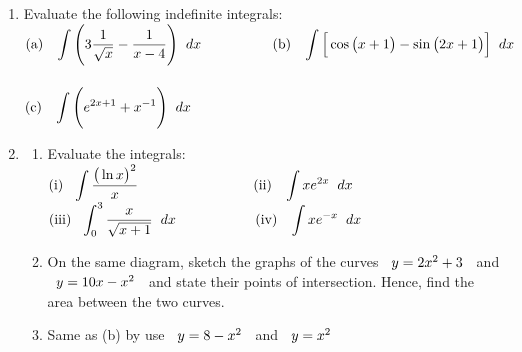 \documentclass[11pt,a4paper]{article}
\begin{document}
\begin{enumerate}
\item Evaluate the following indefinite integrals:\\

$\displaystyle{(\text{a})\hspace{0.3cm} \int \Bigg(3\frac{1}{\sqrt{x}} - \dfrac{1}{x - 4}\Bigg)\hspace{0.2cm}dx\hspace{1.8cm} (\text{b})\hspace{0.3cm} \int\Big[\cos \big(x + 1\big) - \sin \big(2x + 1\big)\Big]\hspace{0.2cm}dx}$\\\\


$\displaystyle{(\text{c})\hspace{0.3cm} \int \Bigg(e^{2x + 1} + x^{-1}\Bigg)\hspace{0.2cm}dx}$\\



\item
\begin{enumerate}
      \item Evaluate the integrals:\\
      
      $(\text{i})\hspace{0.3cm} \displaystyle{\int \dfrac{\big(\ln x\big)^2}{x}\hspace{0.2cm} \hspace{2.7cm} (\text{ii})\hspace{0.3cm} \int xe^{2x}\hspace{0.2cm}dx}$\\
      
      $(\text{iii})\hspace{0.3cm} \displaystyle{\int^3_0\dfrac{x}{\sqrt{x + 1}}\hspace{0.2cm}dx\hspace{2cm} (\text{iv})\hspace{0.3cm} \int xe^{-x}\hspace{0.2cm}dx}$
   
      
      \item On the same diagram, sketch the graphs of the curves $\hspace{0.2cm} y = 2x^2 + 3\hspace{0.2cm}$ and $\hspace{0.2cm} y = 10x - x^2\hspace{0.2cm}$ and state their points of intersection. Hence, find the area between the two curves.
      
      \item Same as (b) by use $\hspace{0.2cm} y = 8 - x^2\hspace{0.2cm}$ and $\hspace{0.2cm} y = x^2$
\end{enumerate}
\end{enumerate}
\end{document}
